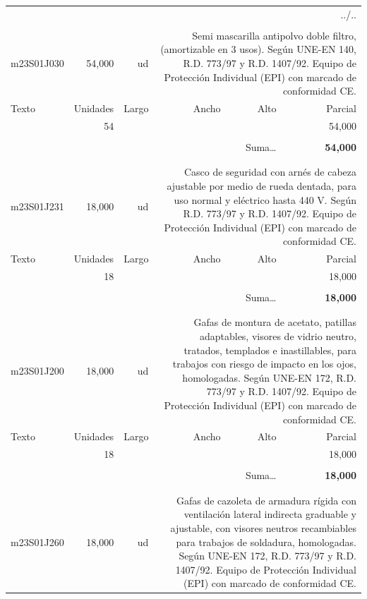\documentclass{book}%
\begin{document}
\begin{longtable}{lrrrrr}%
\multicolumn{6}{r}{../..}\\%
\endfoot%
\endlastfoot%
&&&&&\\%
m23S01J030&    54,000& ud&\multicolumn{3}{p{6cm}}{\scriptsize Semi mascarilla antipolvo doble filtro, (amortizable en 3 usos). Según UNE-EN 140, R.D. 773/97 y R.D. 1407/92. Equipo de Protección Individual (EPI) con marcado de conformidad CE.\normalsize}\\%
Texto&Unidades&Largo&Ancho&Alto&Parcial\\%
\hline%
\multicolumn{1}{p{3.5cm}}{ }&54&&&&    54,000\\%
&&&&&\\%
\multicolumn{5}{r}{Suma\ldots}&\textbf{    54,000}\\%
\hline%
&&&&&\\%
&&&&&\\%
m23S01J231&    18,000& ud&\multicolumn{3}{p{6cm}}{\scriptsize Casco de seguridad con arnés de cabeza ajustable por medio de rueda dentada, para uso normal y eléctrico hasta 440 V. Según R.D. 773/97 y R.D. 1407/92. Equipo de Protección Individual (EPI) con marcado de conformidad CE.\normalsize}\\%
Texto&Unidades&Largo&Ancho&Alto&Parcial\\%
\hline%
\multicolumn{1}{p{3.5cm}}{ }&18&&&&    18,000\\%
&&&&&\\%
\multicolumn{5}{r}{Suma\ldots}&\textbf{    18,000}\\%
\hline%
&&&&&\\%
&&&&&\\%
m23S01J200&    18,000& ud&\multicolumn{3}{p{6cm}}{\scriptsize Gafas de montura de acetato, patillas adaptables, visores de vidrio neutro, tratados, templados e inastillables, para trabajos con riesgo de impacto en los ojos, homologadas. Según UNE-EN 172, R.D. 773/97 y R.D. 1407/92. Equipo de Protección Individual (EPI) con marcado de conformidad CE.\normalsize}\\%
Texto&Unidades&Largo&Ancho&Alto&Parcial\\%
\hline%
\multicolumn{1}{p{3.5cm}}{ }&18&&&&    18,000\\%
&&&&&\\%
\multicolumn{5}{r}{Suma\ldots}&\textbf{    18,000}\\%
\hline%
&&&&&\\%
&&&&&\\%
m23S01J260&    18,000& ud&\multicolumn{3}{p{6cm}}{\scriptsize Gafas de cazoleta de armadura rígida con ventilación lateral indirecta graduable y ajustable, con visores neutros recambiables para trabajos de soldadura, homologadas. Según UNE-EN 172, R.D. 773/97 y R.D. 1407/92. Equipo de Protección Individual (EPI) con marcado de conformidad CE.\normalsize}\\%

\end{longtable}
\end{document}

